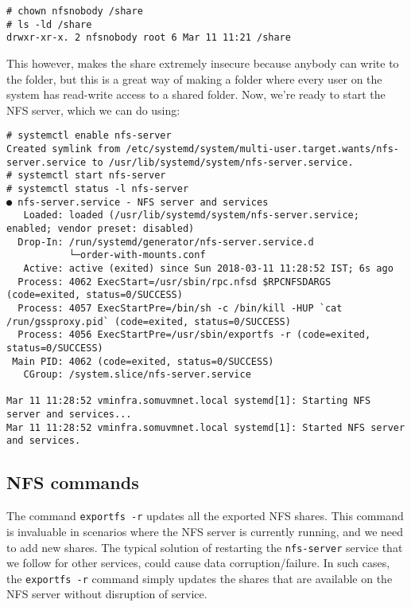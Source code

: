 \vspace{-15pt}
\begin{verbatim}
# chown nfsnobody /share
# ls -ld /share
drwxr-xr-x. 2 nfsnobody root 6 Mar 11 11:21 /share
\end{verbatim}
\vspace{-10pt}	

\noindent
This however, makes the share extremely insecure because anybody can write to the folder, but this is a great way of making a folder where every user on the system has read-write access to a shared folder. Now, we're ready to start the NFS server, which we can do using:

\vspace{-15pt}
\begin{verbatim}
# systemctl enable nfs-server
Created symlink from /etc/systemd/system/multi-user.target.wants/nfs-server.service to /usr/lib/systemd/system/nfs-server.service.
# systemctl start nfs-server
# systemctl status -l nfs-server
● nfs-server.service - NFS server and services
   Loaded: loaded (/usr/lib/systemd/system/nfs-server.service; enabled; vendor preset: disabled)
  Drop-In: /run/systemd/generator/nfs-server.service.d
           └─order-with-mounts.conf
   Active: active (exited) since Sun 2018-03-11 11:28:52 IST; 6s ago
  Process: 4062 ExecStart=/usr/sbin/rpc.nfsd $RPCNFSDARGS (code=exited, status=0/SUCCESS)
  Process: 4057 ExecStartPre=/bin/sh -c /bin/kill -HUP `cat /run/gssproxy.pid` (code=exited, status=0/SUCCESS)
  Process: 4056 ExecStartPre=/usr/sbin/exportfs -r (code=exited, status=0/SUCCESS)
 Main PID: 4062 (code=exited, status=0/SUCCESS)
   CGroup: /system.slice/nfs-server.service

Mar 11 11:28:52 vminfra.somuvmnet.local systemd[1]: Starting NFS server and services...
Mar 11 11:28:52 vminfra.somuvmnet.local systemd[1]: Started NFS server and services.
\end{verbatim}
\vspace{-10pt}	

\subsection{NFS commands}
The command \verb|exportfs -r| updates all the exported NFS shares. This command is invaluable in scenarios where the NFS server is currently running, and we need to add new shares. The typical solution of restarting the \verb|nfs-server| service that we follow for other services, could cause data corruption/failure. In such cases, the \verb|exportfs -r| command simply updates the shares that are available on the NFS server without disruption of service. 

